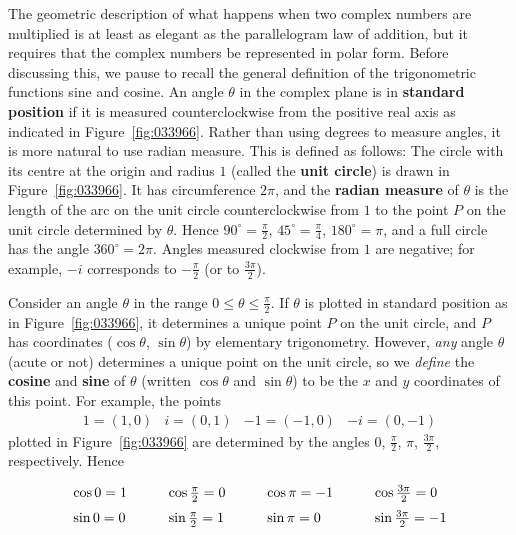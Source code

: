 The geometric description of what 
happens when two complex numbers are multiplied is at least as elegant 
as the parallelogram law of addition, but it requires that the complex 
numbers be represented in polar form. Before discussing this, we pause 
to recall the general definition of the trigonometric functions sine and
 cosine. An angle $\theta$ in the complex plane is in \textbf{standard position} if it is measured counterclockwise from the positive real axis as indicated in Figure~\ref{fig:033966}.
 Rather than using degrees to measure angles, it is more natural to use 
radian measure. This is defined as follows: The circle with its centre 
at the origin and radius $1$ (called the \textbf{unit circle}) is drawn in Figure~\ref{fig:033966}. It has circumference $2\pi$, and the \textbf{radian measure} of $\theta$ is the length of the arc on the unit circle counterclockwise from $1$ to the point $P$ on the unit circle determined by $\theta$. Hence $90^{\circ} = \frac{\pi}{2}$, $45^{\circ}  = \frac{\pi}{4}$, $180^{\circ}  = \pi$, and a full circle has the angle $360^{\circ}  = 2\pi$. Angles measured clockwise from $1$ are negative; for example, $-i$ corresponds to $-\frac{\pi}{2}$ (or to $\frac{3\pi}{2}$).

Consider an angle $\theta$ in the range $0 \leq \theta \leq \frac{\pi}{2}$. If $\theta$ is plotted in standard position as in Figure~\ref{fig:033966}, it determines a unique point $P$ on the unit circle, and $P$ has coordinates ($\cos \theta$, $\sin \theta$) by elementary trigonometry. However, \textit{any} angle $\theta$ (acute or not) determines a unique point on the unit circle, so we \textit{define} the \textbf{cosine} and \textbf{sine} of $\theta$ (written $\cos \theta$ and $\sin \theta$) to be the $x$ and $y$ coordinates of this point. For example, the points
\begin{equation*}
\begin{array}{llll}
1=(1,0) & i=(0,1) & -1=(-1,0) & -i=(0,-1)
\end{array}
\end{equation*}
plotted in Figure~\ref{fig:033966} are determined by the angles $0$, $\frac{\pi}{2}$, $\pi$, $\frac{3\pi}{2}$, respectively. Hence
\begin{equation*}
\def\arraystretch{1.5}
\begin{array}{lllllll}
\cos 0 = 1 & \quad & \cos \frac{\pi}{2} = 0 & \quad & \cos \pi = -1 & \quad & \cos \frac{3\pi}{2} = 0\\
\sin 0 = 0 & & \sin \frac{\pi}{2} = 1 & & \sin \pi = 0 & &\sin \frac{3\pi}{2} = -1
\end{array}
\end{equation*}


